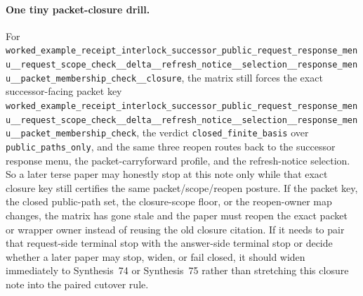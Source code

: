 \documentclass[11pt]{article}
\begin{document}
\paragraph{One tiny packet-closure drill.}
For \nolinkurl{worked_example_receipt_interlock_successor_public_request_response_menu__request_scope_check__delta__refresh_notice__selection__response_menu__packet_membership_check__closure}, the matrix still forces the exact successor-facing packet key \nolinkurl{worked_example_receipt_interlock_successor_public_request_response_menu__request_scope_check__delta__refresh_notice__selection__response_menu__packet_membership_check}, the verdict \nolinkurl{closed_finite_basis} over \nolinkurl{public_paths_only}, and the same three reopen routes back to the successor response menu, the packet-carryforward profile, and the refresh-notice selection. So a later terse paper may honestly stop at this note only while that exact closure key still certifies the same packet/scope/reopen posture. If the packet key, the closed public-path set, the closure-scope floor, or the reopen-owner map changes, the matrix has gone stale and the paper must reopen the exact packet or wrapper owner instead of reusing the old closure citation. If it needs to pair that request-side terminal stop with the answer-side terminal stop or decide whether a later paper may stop, widen, or fail closed, it should widen immediately to Synthesis~74 or Synthesis~75 rather than stretching this closure note into the paired cutover rule.\cite{series:workedexample}
\end{document}
